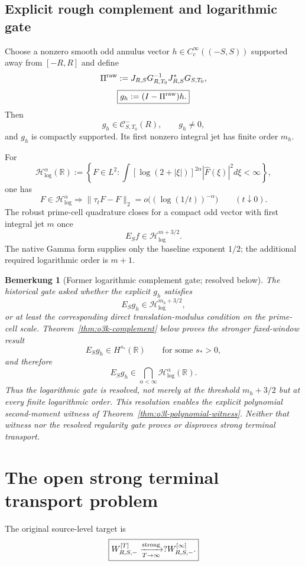 \documentclass[11pt,a4paper]{amsart}
\newtheorem{remark}[theorem]{Bemerkung}
\newcommand{\HG}{\mathscr H_{\log}}
\begin{document}
\subsection{Explicit rough complement and logarithmic gate}

Choose a nonzero smooth odd annulus vector $h\in C_c^\infty((-S,S))$ supported away from
$[-R,R]$ and define
\[
 \Pi^{\rm raw}
 :=J_{R,S}G_{R,T_0}^{-1}J_{R,S}^*G_{S,T_0},
\]
\[
 \boxed{g_h:=(I-\Pi^{\rm raw})h.}
\]
Then
\[
 g_h\in\mathcal C^-_{S,T_0}(R),
 \qquad g_h\ne0,
\]
and $g_h$ is compactly supported.  Its first nonzero integral jet has finite order
$m_h$.

For
\[
 \HG^\alpha(\mathbb R)
 :=\left\{F\in L^2:
 \int[\log(2+|\xi|)]^{2\alpha}|\widehat F(\xi)|^2d\xi<\infty
 \right\},
\]
one has
\[
 F\in\HG^\alpha
 \Longrightarrow
 \|\tau_tF-F\|_2
 =o\bigl((\log(1/t))^{-\alpha}\bigr)
 \qquad(t\downarrow0).
\]
The robust prime-cell quadrature closes for a compact odd vector with first integral jet
$m$ once
\[
 E_Sf\in\HG^{m+3/2}.
\]
The native Gamma form supplies only the baseline exponent $1/2$; the additional required
logarithmic order is $m+1$.

\begin{remark}[Former logarithmic complement gate; resolved below]\label{open:log}
The historical gate asked whether the explicit $g_h$ satisfies
\[
 E_Sg_h\in\HG^{m_h+3/2},
\]
or at least the corresponding direct translation-modulus condition on the prime-cell
scale.  Theorem~\ref{thm:o3k-complement} below proves the stronger fixed-window result
\[
 E_Sg_h\in H^{s_*}(\mathbb R)
 \qquad\text{for some }s_*>0,
\]
and therefore
\[
 E_Sg_h\in\bigcap_{\alpha<\infty}\HG^\alpha(\mathbb R).
\]
Thus the logarithmic gate is resolved, not merely at the threshold
$m_h+3/2$ but at every finite logarithmic order.  This resolution enables the explicit
polynomial second-moment witness of Theorem~\ref{thm:o3l-polynomial-witness}.  Neither
that witness nor the resolved regularity gate proves or disproves strong terminal
transport.
\end{remark}



\section{The open strong terminal transport problem}\label{sec:open}

The original source-level target is
\[
 \boxed{
 W_{R,S,-}^{[T]}
 \xrightarrow[T\to\infty]{\rm strong}?
 W_{R,S,-}^{[\infty]}.
 }
\]
\end{document}
